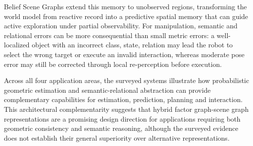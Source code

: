 Belief Scene Graphs \cite{saucedo_estimating_2025} extend this memory to unobserved regions, transforming the world model from reactive record into a predictive spatial memory that can guide active exploration under partial observability.
For manipulation, semantic and relational errors can be more consequential than small metric errors: a well-localized object with an incorrect class, state, relation may lead the robot to select the wrong target or execute an invalid interaction, whereas moderate pose error may still be corrected through local re-perception before execution.

\bigskip

Across all four application areas,  the surveyed systems illustrate how probabilistic geometric estimation and semantic-relational abstraction can provide complementary capabilities for estimation, prediction, planning and interaction. 
This architectural complementarity suggests that hybrid factor graph-scene graph representations are a promising design direction for applications requiring both geometric consistency and semantic reasoning, although the surveyed evidence does not establish their general superiority over alternative representations.

